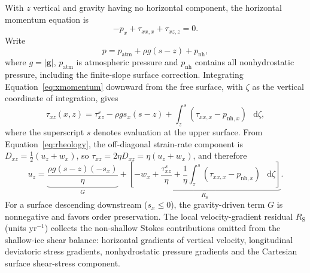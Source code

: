 \documentclass[review]{igs}
\begin{document}
With \(z\) vertical and gravity having no horizontal component, the horizontal momentum equation is
\begin{equation}
-p_x+\tau_{xx,x}+\tau_{xz,z}=0.
\label{eq:xmomentum}
\end{equation}
Write
\begin{equation}
p=p_{\mathrm{atm}}+\rho g(s-z)+p_{\mathrm{nh}},
\label{eq:pressuredecomp}
\end{equation}
where \(g=|\bm{g}|\), \(p_{\mathrm{atm}}\) is atmospheric pressure and \(p_{\mathrm{nh}}\) contains all nonhydrostatic pressure, including the finite-slope surface correction. Integrating Equation~\ref{eq:xmomentum} downward from the free surface, with \(\zeta\) as the vertical coordinate of integration, gives
\begin{equation}
\tau_{xz}(x,z)
=\tau_{xz}^{s}
-\rho g s_x(s-z)
+\int_z^s\left(\tau_{xx,x}-p_{\mathrm{nh},x}\right)\,\mathop{}\!\mathrm{d}\zeta,
\label{eq:tauxzint}
\end{equation}
where the superscript \(s\) denotes evaluation at the upper surface. From Equation~\ref{eq:rheology}, the off-diagonal strain-rate component is \(D_{xz}=\tfrac12(u_z+w_x)\), so \(\tau_{xz}=2\eta D_{xz}=\eta(u_z+w_x)\), and therefore
\begin{equation}
 u_z
 =\underbrace{\frac{\rho g(s-z)(-s_x)}{\eta}}_{G}
 +\underbrace{
 \left[
 -w_x+\frac{\tau_{xz}^{s}}{\eta}
 +\frac{1}{\eta}\int_z^s
 \left(\tau_{xx,x}-p_{\mathrm{nh},x}\right)\,\mathop{}\!\mathrm{d}\zeta
 \right]}_{R_{\mathrm{S}}}.
\label{eq:uzdecomp}
\end{equation}
For a surface descending downstream (\(s_x\leq0\)), the gravity-driven term \(G\) is nonnegative and favors order preservation. The local velocity-gradient residual \(R_{\mathrm{S}}\) (units \(\mathrm{yr^{-1}}\)) collects the non-shallow Stokes contributions omitted from the shallow-ice shear balance: horizontal gradients of vertical velocity, longitudinal deviatoric stress gradients, nonhydrostatic pressure gradients and the Cartesian surface shear-stress component.
\end{document}
